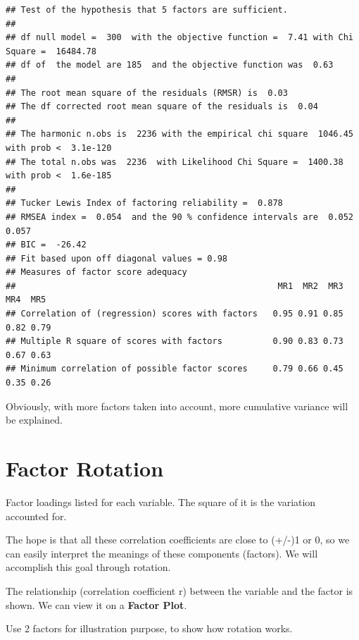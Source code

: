 \documentclass[
]{ctexart}
\newenvironment{Shaded}{\begin{snugshade}}{\end{snugshade}}
\newcommand{\AttributeTok}[1]{\textcolor[rgb]{0.13,0.29,0.53}{#1}}
\newcommand{\CommentTok}[1]{\textcolor[rgb]{0.56,0.35,0.01}{\textit{#1}}}
\newcommand{\DecValTok}[1]{\textcolor[rgb]{0.00,0.00,0.81}{#1}}
\newcommand{\FunctionTok}[1]{\textcolor[rgb]{0.13,0.29,0.53}{\textbf{#1}}}
\newcommand{\NormalTok}[1]{#1}
\newcommand{\OtherTok}[1]{\textcolor[rgb]{0.56,0.35,0.01}{#1}}
\newcommand{\SpecialCharTok}[1]{\textcolor[rgb]{0.81,0.36,0.00}{\textbf{#1}}}
\newcommand{\StringTok}[1]{\textcolor[rgb]{0.31,0.60,0.02}{#1}}
\begin{document}
\begin{verbatim}
## Test of the hypothesis that 5 factors are sufficient.
## 
## df null model =  300  with the objective function =  7.41 with Chi Square =  16484.78
## df of  the model are 185  and the objective function was  0.63 
## 
## The root mean square of the residuals (RMSR) is  0.03 
## The df corrected root mean square of the residuals is  0.04 
## 
## The harmonic n.obs is  2236 with the empirical chi square  1046.45  with prob <  3.1e-120 
## The total n.obs was  2236  with Likelihood Chi Square =  1400.38  with prob <  1.6e-185 
## 
## Tucker Lewis Index of factoring reliability =  0.878
## RMSEA index =  0.054  and the 90 % confidence intervals are  0.052 0.057
## BIC =  -26.42
## Fit based upon off diagonal values = 0.98
## Measures of factor score adequacy             
##                                                    MR1  MR2  MR3  MR4  MR5
## Correlation of (regression) scores with factors   0.95 0.91 0.85 0.82 0.79
## Multiple R square of scores with factors          0.90 0.83 0.73 0.67 0.63
## Minimum correlation of possible factor scores     0.79 0.66 0.45 0.35 0.26
\end{verbatim}

Obviously, with more factors taken into account, more cumulative
variance will be explained.

\hypertarget{factor-rotation}{%
\section{Factor Rotation}\label{factor-rotation}}

Factor loadings listed for each variable. The square of it is the
variation accounted for.

The hope is that all these correlation coefficients are close to (+/-)1
or 0, so we can easily interpret the meanings of these components
(factors). We will accomplish this goal through rotation.

The relationship (correlation coefficient r) between the variable and
the factor is shown. We can view it on a \textbf{Factor Plot}.

Use 2 factors for illustration purpose, to show how rotation works.

\begin{Shaded}
\end{Shaded}
\end{document}
